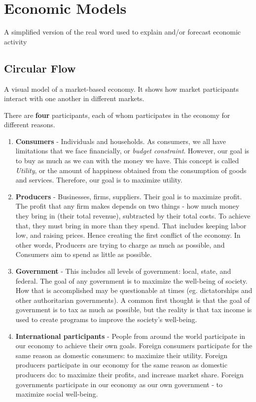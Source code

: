 \documentclass{article}
\begin{document}
\section{Economic Models}

A simplified version of the real word used to explain and/or forecast economic activity

    \subsection{Circular Flow}
    
    A visual model of a market-based economy. It shows how market participants interact with one another in different markets.
    
    There are \textbf{four} participants, each of whom participates in the economy for different reasons.
    \begin{enumerate}
        \item{\textbf{Consumers} - Individuals and households. As consumers, we all have limitations that we face financially, or \textit{budget constraint}. However, our goal is to buy as much as we can with the money we have. This concept is called \textit{Utility}, or the amount of happiness obtained from the consumption of goods and services. Therefore, our goal is to maximize utility.}

        \item{\textbf{Producers} - Businesses, firms, suppliers. Their goal is to maximize profit. The profit that any firm makes depends on two things - how much money they bring in (their total revenue), subtracted by their total costs. To achieve that, they must bring in more than they spend. That includes keeping labor low, and raising prices. Hence creating the first conflict of the economy. In other words, Producers are trying to charge as much as possible, and Consumers aim to spend as little as possible.}

        \item{\textbf{Government} - This includes all levels of government: local, state, and federal. The goal of any government is to maximize the well-being of society. How that is accomplished may be questionable at times (eg. dictatorships and other authoritarian governments). A common first thought is that the goal of government is to tax as much as possible, but the reality is that tax income is used to create programs to improve the society's well-being.}

        \item{\textbf{International participants} - People from around the world participate in our economy to achieve their own goals. Foreign consumers participate for the same reason as domestic consumers: to maximize their utility. Foreign producers participate in our economy for the same reason as domestic producers do: to maximize their profits, and increase market share. Foreign governments participate in our economy as our own government - to maximize social well-being.}
    \end{enumerate}
\end{document}
